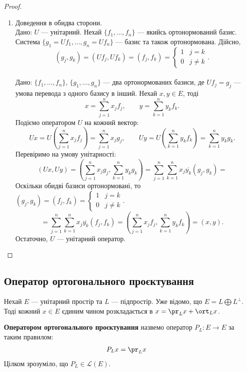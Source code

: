 \documentclass{math_library}
\begin{document}
\begin{proof}
\begin{enumerate}[topsep=0pt, wide=0pt, label={\arabic*)}]
\item Доведення в обидва сторони.\\
\rightproof Дано: $U$ --- унітарний. Нехай $\{f_1,\dots,f_n\}$ --- якийсь ортонормований базис. Система $\{g_1 = Uf_1, \dots, g_n = Uf_n\}$ --- базис та також ортонормована. Дійсно,
\[
(g_j,g_k) = (Uf_j, Uf_k) = (f_j,f_k) = \begin{cases} 1 & j = k \\ 0 & j \neq k \end{cases}.
\]
\bigskip \\
\leftproof Дано: $\{f_1,\dots,f_n\}$, $\{g_1,\dots,g_n\}$ --- два ортонормованих базиси, де $Uf_j = g_j$ --- умова перевода з одного базису в інший. Нехай $x,y \in E$, тоді
\[
x = \displaystyle \sum_{j=1}^n x_j f_j, \qquad
y = \displaystyle \sum_{k=1}^n y_k f_k.
\]
Подіємо оператором $U$ на кожний вектор:
\[
Ux = \displaystyle U\left(\sum_{j=1}^n x_j f_j \right) = \sum_{j=1}^n x_j g_j, \qquad
Uy = \displaystyle U\left(\sum_{k=1}^n y_k f_k \right) = \sum_{k=1}^n y_k g_k.
\]
Перевіримо на умову унітарності:
\[
(Ux, Uy) = \left(\sum_{j=1}^n x_j g_j, \sum_{k=1}^n y_k g_k \right) = \sum_{j=1}^n \sum_{k=1}^n x_j \overline{y_k} (g_j,g_k) \boxed{=}
\]
Оскільки обидві базиси ортонормовані, то $(g_j,g_k) = (f_j,f_k) = \begin{cases} 1 & j = k \\ 0 & j \neq k \end{cases}$.
\[
\boxed{=} \displaystyle \sum_{j=1}^n \sum_{k=1}^n x_j \overline{y_k} (f_j,f_k) = \left(\sum_{j=1}^n x_jf_j, \sum_{k=1}^n y_k f_k \right) = (x,y).
\]
Остаточно, $U$ --- унітарний оператор. \qedhere
\end{enumerate}
\end{proof}

\subsection{Оператор ортогонального проєктування}
Нехай $E$ --- унітарний простір та $L$ --- підпростір. Уже відомо, що $E = L \bigoplus L^{\perp}$. Тоді кожний $x \in E$ єдиним чином розкладається в $x = \pr_L x + \ort_L x$.

\begin{definition}
\textbf{Оператором ортогонального проєктування} назвемо оператор $P_L \colon E \to E$ за таким правилом:
\begin{align*}
P_L x = \pr_L x
\end{align*}
Цілком зрозуміло, що $P_L \in \mathcal{L}(E)$.
\end{definition}
\end{document}
